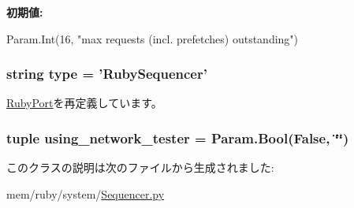 \label{classSequencer_1_1RubySequencer_aea9a472530ae31f7705dc2511123df13}
{\bfseries 初期値:}
\begin{DoxyCode}
Param.Int(16,
        "max requests (incl. prefetches) outstanding")
\end{DoxyCode}
\hypertarget{classSequencer_1_1RubySequencer_acce15679d830831b0bbe8ebc2a60b2ca}{
\subsubsection[{type}]{\setlength{\rightskip}{0pt plus 5cm}string {\bf type} = '{\bf RubySequencer}'}}
\label{classSequencer_1_1RubySequencer_acce15679d830831b0bbe8ebc2a60b2ca}


\hyperlink{classSequencer_1_1RubyPort_acce15679d830831b0bbe8ebc2a60b2ca}{RubyPort}を再定義しています。\hypertarget{classSequencer_1_1RubySequencer_a4712a4cfd29e8a799de69ec5010f9de3}{
\subsubsection[{using\_\-network\_\-tester}]{\setlength{\rightskip}{0pt plus 5cm}tuple {\bf using\_\-network\_\-tester} = Param.Bool(False, \char`\"{}\char`\"{})}}
\label{classSequencer_1_1RubySequencer_a4712a4cfd29e8a799de69ec5010f9de3}


このクラスの説明は次のファイルから生成されました:\begin{DoxyCompactItemize}
\item 
mem/ruby/system/\hyperlink{Sequencer_8py}{Sequencer.py}\end{DoxyCompactItemize}
